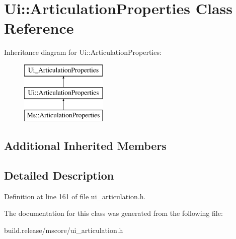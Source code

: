 \hypertarget{class_ui_1_1_articulation_properties}{}\section{Ui\+:\+:Articulation\+Properties Class Reference}
\label{class_ui_1_1_articulation_properties}
Inheritance diagram for Ui\+:\+:Articulation\+Properties\+:\begin{figure}[H]
\begin{center}
\leavevmode
\includegraphics[height=3.000000cm]{class_ui_1_1_articulation_properties}
\end{center}
\end{figure}
\subsection*{Additional Inherited Members}


\subsection{Detailed Description}


Definition at line 161 of file ui\+\_\+articulation.\+h.



The documentation for this class was generated from the following file\+:\begin{DoxyCompactItemize}
\item 
build.\+release/mscore/ui\+\_\+articulation.\+h\end{DoxyCompactItemize}
